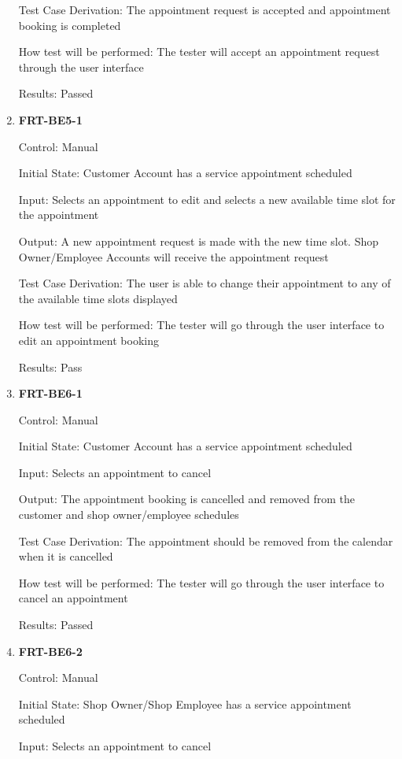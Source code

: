 \documentclass[12pt, titlepage]{article}
\begin{document}
\begin{enumerate}
	      Test Case Derivation: The appointment request is accepted and appointment booking is completed

	      How test will be performed: The tester will accept an appointment request through the user
	      interface

	      Results: Passed

	\item \textbf{FRT-BE5-1}

	      Control: Manual

	      Initial State: Customer Account has a service appointment scheduled

	      Input: Selects an appointment to edit and selects a new available time slot for the appointment

	      Output: A new appointment request is made with the new time slot. Shop Owner/Employee Accounts will
	      receive the appointment request

	      Test Case Derivation: The user is able to change their appointment to any of the available time
	      slots displayed

	      How test will be performed: The tester will go through the user interface to edit an appointment
	      booking

	      Results: Pass

	\item \textbf{FRT-BE6-1}

	      Control: Manual

	      Initial State: Customer Account has a service appointment scheduled

	      Input: Selects an appointment to cancel

	      Output: The appointment booking is cancelled and removed from the customer and shop owner/employee
	      schedules

	      Test Case Derivation: The appointment should be removed from the calendar when it is cancelled

	      How test will be performed: The tester will go through the user interface to cancel an appointment

	      Results: Passed

	\item \textbf{FRT-BE6-2}

	      Control: Manual

	      Initial State: Shop Owner/Shop Employee has a service appointment scheduled

	      Input: Selects an appointment to cancel


\end{enumerate}
\end{document}
